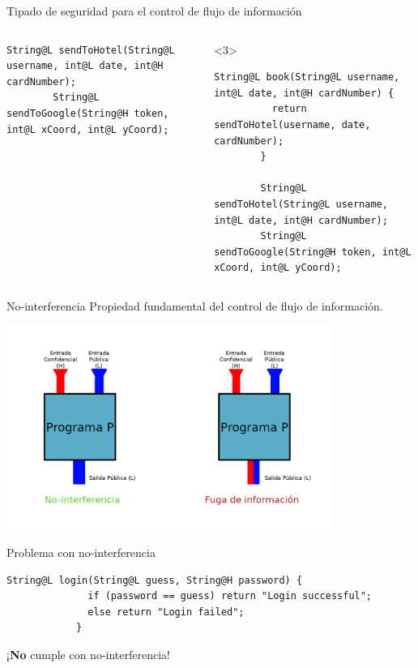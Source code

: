 \documentclass[aspectratio=169,10pt]{beamer}
\begin{document}
\begin{frame}[fragile]{Tipado de seguridad para el control de flujo de información}
\begin{columns}[T,onlytextwidth]
\begin{onlyenv}
\begin{lstlisting}[escapechar=?]
        String@L sendToHotel(String@L username, int@L date, int@H cardNumber);
        String@L sendToGoogle(String@H token, int@L xCoord, int@L yCoord);
      \end{lstlisting}
    \end{onlyenv}
		\begin{onlyenv}<3>
      \begin{lstlisting}[escapechar=?]
        String@L book(String@L username, int@L date, int@H cardNumber) {
          return sendToHotel(username, date, cardNumber);
        }

        String@L sendToHotel(String@L username, int@L date, int@H cardNumber);
        String@L sendToGoogle(String@H token, int@L xCoord, int@L yCoord);
      \end{lstlisting}
    \end{onlyenv}
  \end{columns}

\end{frame}

\begin{frame}[fragile]{No-interferencia}
  Propiedad fundamental del control de flujo de información.
	\begin{center}
		\includegraphics[width=0.8\textwidth]{images/noninterference.png}
	\end{center}
\end{frame}

\begin{frame}[fragile]{Problema con no-interferencia}
	\begin{center}
\begin{lstlisting}[basicstyle=\fontsize{9}{9}\ttfamily]
            String@L login(String@L guess, String@H password) {
              if (password == guess) return "Login successful";
              else return "Login failed";
            }
\end{lstlisting} \pause
		\vspace{3cm}
		\alert{¡\textbf{No} cumple con no-interferencia!}
	\end{center}
\end{frame}
\end{document}
